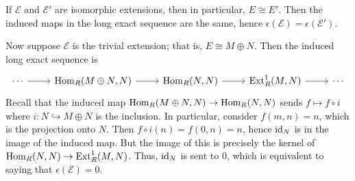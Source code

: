 \documentclass[../../master.tex]{subfiles}
\begin{document}
\begin{solution}
    If $\mathscr{E}$ and $\mathscr{E}'$ are isomorphic extensions, then in particular, $E \cong E'$.
    Then the induced maps in the long exact sequence are the same, hence $\epsilon(\mathscr{E}) = \epsilon(\mathscr{E}')$.
    
    Now suppose $\mathscr{E}$ is the trivial extension;
    that is, $E \cong M \oplus N$.
    Then the induced long exact sequence is
    \[
    \begin{tikzcd}
        \cdots & \Hom_R(M \oplus N, N) & \Hom_R(N, N) & \Ext_R^{1}(M, N) & \cdots
        \arrow[from=1-1, to=1-2]
        \arrow[from=1-2, to=1-3]
        \arrow[from=1-3, to=1-4]
        \arrow[from=1-4, to=1-5] 
    \end{tikzcd}
    \]
    Recall that the induced map $\operatorname{Hom}_R(M \oplus N, N) \to \operatorname{Hom}_R(N, N)$ sends $f \mapsto f \circ i$ where $i : N \hookrightarrow M \oplus N$ is the inclusion.
    In particular, consider $f(m, n) = n$, which is the projection onto $N$.
    Then $f \circ i(n) = f(0, n) = n$, hence $\operatorname{id}_N$ is in the image of the induced map.
    But the image of this is precisely the kernel of $\operatorname{Hom}_R(N, N) \to \operatorname{Ext}_R^{1}(M, N)$.
    Thus, $\operatorname{id}_N$ is sent to 0, which is equivalent to saying that $\epsilon(\mathscr{E}) = 0$.
\end{solution}
\end{document}
